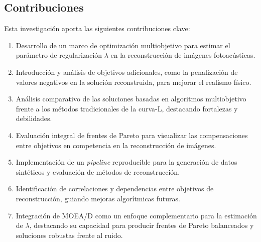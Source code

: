 \subsection{Contribuciones} \label{sec:cont}

Esta investigación aporta las siguientes contribuciones clave:

\begin{enumerate}[start=1,label={C\arabic*:},wide = 0pt, leftmargin = 3em]
    \item Desarrollo de un marco de optimización multiobjetivo para estimar el parámetro de regularización \( \lambda \) en la reconstrucción de imágenes fotoacústicas.
    \item Introducción y análisis de objetivos adicionales, como la penalización de valores negativos en la solución reconstruida, para mejorar el realismo físico.
    \item Análisis comparativo de las soluciones basadas en algoritmos multiobjetivo frente a los métodos tradicionales de la curva-L, destacando fortalezas y debilidades.
    \item Evaluación integral de frentes de Pareto para visualizar las compensaciones entre objetivos en competencia en la reconstrucción de imágenes.
    \item Implementación de un \textit{pipeline} reproducible para la generación de datos sintéticos y evaluación de métodos de reconstrucción.
    \item Identificación de correlaciones y dependencias entre objetivos de reconstrucción, guiando mejoras algorítmicas futuras.
    \item Integración de MOEA/D como un enfoque complementario para la estimación de \( \lambda \), destacando su capacidad para producir frentes de Pareto balanceados y soluciones robustas frente al ruido.
\end{enumerate}
